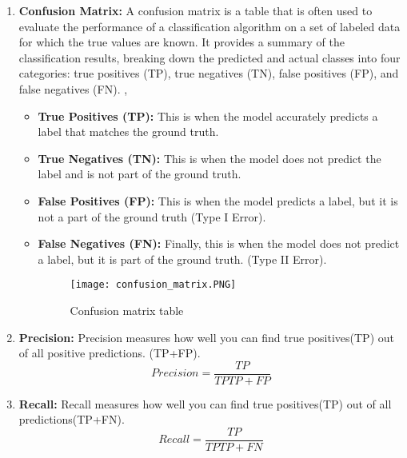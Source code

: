 \begin{enumerate}
    \item \textbf{Confusion Matrix: }A confusion matrix is a table that is often used to evaluate the performance of a classification algorithm on a set of labeled data for which the true values are known. It provides a summary of the classification results, breaking down the predicted and actual classes into four categories: true positives (TP), true negatives (TN), false positives (FP), and false negatives (FN). \cite{padilla2020survey}, \cite{li2019analysis}
    \begin{itemize}
        \item \textbf{True Positives (TP): } This is when the model accurately predicts a label that matches the ground truth.\\
        \item \textbf{True Negatives (TN): } This is when the model does not predict the label and is not part of the ground truth.\\
        \item  \textbf{False Positives (FP): } This is when the model predicts a label, but it is not a part of the ground truth (Type I Error).\\
        \item \textbf{False Negatives (FN): } Finally, this is when the model does not predict a label, but it is part of the ground truth. (Type II Error).
        \begin{figure}[H]
            \centering
            \texttt{[image: confusion\_matrix.PNG]}
            \caption{Confusion matrix table}
            \label{fig:Confusion_Matrix}
        \end{figure}
    \end{itemize}
    \item \textbf{Precision: } Precision measures how well you can find true positives(TP) out of all positive predictions. (TP+FP).
    $$Precision=\frac{TP}{TPTP+FP}$$

    \item \textbf{Recall: } Recall measures how well you can find true positives(TP) out of all predictions(TP+FN).
    $$Recall=\frac{TP}{TPTP+FN}$$
    
  
\end{enumerate}


